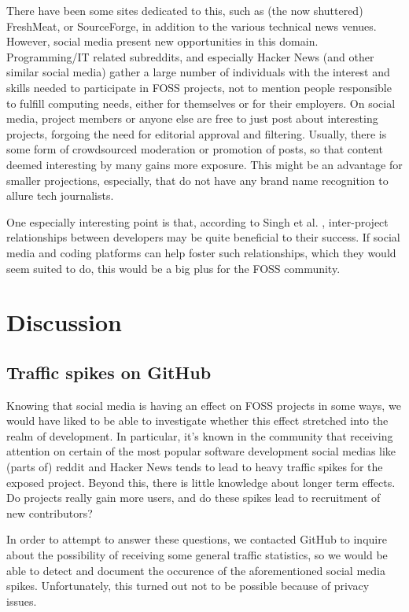 \documentclass[a4paper,11pt]{article} %
\begin{document}
There have been some sites dedicated to this, such as (the now shuttered)
FreshMeat, or SourceForge, in addition to the various technical news
venues. However, social media present new opportunities in this
domain. Programming/IT related subreddits, and especially Hacker News (and
other similar social media) gather a large number of individuals with the
interest and skills needed to participate in FOSS projects, not to mention
people responsible to fulfill computing needs, either for themselves or for
their employers.  On social media, project members or anyone else are free
to just post about interesting projects, forgoing the need for editorial
approval and filtering. Usually, there is some form of crowdsourced
moderation or promotion of posts, so that content deemed interesting by many
gains more exposure. This might be an advantage for smaller projections,
especially, that do not have any brand name recognition to allure tech
journalists.

One especially interesting point is that, according to Singh et
al. \cite{singh2011network}, inter-project relationships between developers
may be quite beneficial to their success. If social media and coding
platforms can help foster such relationships, which they would seem suited
to do, this would be a big plus for the FOSS community.

\section{Discussion}

\subsection{Traffic spikes on GitHub}

Knowing that social media is having an effect on FOSS projects in some ways,
we would have liked to be able to investigate whether this effect stretched
into the realm of development. In particular, it's known in the community
that receiving attention on certain of the most popular software development
social medias like (parts of) reddit and Hacker News tends to lead to heavy
traffic spikes for the exposed project. Beyond this, there is little
knowledge about longer term effects. Do projects really gain more users, and
do these spikes lead to recruitment of new contributors?

In order to attempt to answer these questions, we contacted GitHub to
inquire about the possibility of receiving some general traffic statistics,
so we would be able to detect and document the occurence of the
aforementioned social media spikes. Unfortunately, this turned out not to be
possible because of privacy issues.
\end{document}
